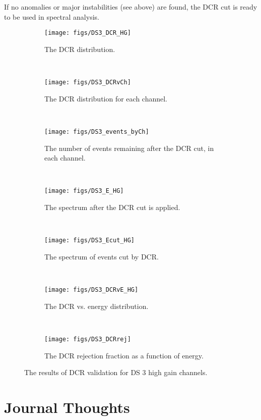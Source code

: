 \documentclass[groupedaddress,rmp,amsmath,amssymb,bibnotes,altaffilletter,twocolumn]{revtex4-1}
\begin{document}
If no anomalies or major instabilities (see above) are found, the DCR cut is ready to be used in spectral analysis. 

\begin{figure*}[h]
 \centering
 \begin{subfigure}[b]{0.4\textwidth}
   \texttt{[image: figs/DS3\_DCR\_HG]}
    \caption{The DCR distribution.}
    \label{fig:DS3_DCR}
  \end{subfigure}
   ~
 \begin{subfigure}[b]{0.4\textwidth}
   \texttt{[image: figs/DS3\_DCRvCh]}
    \caption{The DCR distribution for each channel.}
    \label{fig:DS3_DCRvCh}
  \end{subfigure}
   ~
 \begin{subfigure}[b]{0.4\textwidth}
   \texttt{[image: figs/DS3\_events\_byCh]}
    \caption{The number of events remaining after the DCR cut, in each channel.}
    \label{fig:events_byCh}
  \end{subfigure}
   ~
  \begin{subfigure}[b]{0.4\textwidth}
   \texttt{[image: figs/DS3\_E\_HG]}
    \caption{The spectrum after the DCR cut is applied.}
    \label{fig:DS3_E_HG}
  \end{subfigure}
   ~
  \begin{subfigure}[b]{0.4\textwidth}
   \texttt{[image: figs/DS3\_Ecut\_HG]}
    \caption{The spectrum of events cut by DCR.}
    \label{fig:DS3_Ecut_HG}
  \end{subfigure}
   ~
     \begin{subfigure}[b]{0.4\textwidth}
   \texttt{[image: figs/DS3\_DCRvE\_HG]}
    \caption{The DCR vs. energy distribution.}
    \label{fig:DS3_DCRvE_HG}
  \end{subfigure}
     ~
     \begin{subfigure}[b]{0.4\textwidth}
   \texttt{[image: figs/DS3\_DCRrej]}
    \caption{The DCR rejection fraction as a function of energy.}
    \label{fig:DS3_DCRrej}
  \end{subfigure}
  \caption{The results of DCR validation for DS 3 high gain channels.}
  \end{figure*}

\section{Journal Thoughts}


\end{document}
